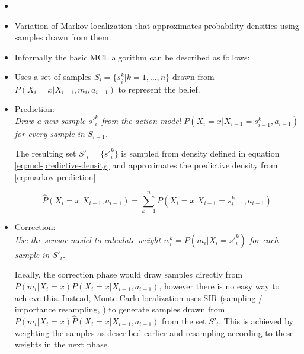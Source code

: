 \begin{itemize}
\item\cite{dellaert99}
\item Variation of Markov localization that approximates probability densities using
	samples drawn from them.
\item Informally the basic MCL algorithm can be described as follows:

\item Uses a set of samples \(S_i = \{s^k_{i} | k = 1,\dotsc,n\} \) drawn from
	\(P(X_i = x | X_{i-1}, m_i, a_{i - 1})\) to represent the belief.

\item Prediction:\\
	\emph{
	Draw a new sample \(s'^k_{i}\)
	from the action model \(P(X_i = x | X_{i-1} = s^k_{i-1}, a_{i - 1})\)
	for every sample in \(S_{i-1}\).
	}

	The resulting set \(S'_i = \{s'^k_{i}\} \) is sampled from
	density defined in equation \eqref{eq:mcl-predictive-density} and approximates the predictive
	density from \eqref{eq:markov-prediction}
	
	\begin{equation}
		\label{eq:mcl-predictive-density}
		\hat{P}(X_i = x | X_{i - 1}, a_{i - 1}) =
		\sum_{k = 1}^n P(X_i = x | X_{i-1} = s^k_{i-1}, a_{i - 1})
	\end{equation}

\item Correction:\\
	\emph{
	Use the sensor model to calculate weight \(w^k_i = P(m_i | X_i = s'^k_i)\)
	for each sample in \(S'_i\).
	}

	Ideally, the correction phase would draw samples directly from
	\(P(m_i | X_i = x) P(X_i = x | X_{i - 1}, a_{i - 1})\),
	however there is no easy way to achieve this.
	Instead, Monte Carlo localization 
	uses SIR (sampling / importance resampling, \cite{smith92})
	to generate samples drawn from
	\(P(m_i | X_i = x) \hat{P}(X_i = x | X_{i - 1}, a_{i - 1})\) from the set \(S'_i\).
	This is achieved by weighting the samples as described earlier and resampling
	according to these weights in the next phase.


\end{itemize}
